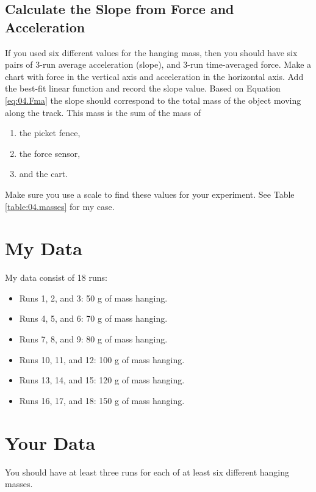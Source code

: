 \subsection{Calculate the Slope from Force and Acceleration}
%
If you used six different values for the hanging mass, then you should have six pairs of 3-run average acceleration (slope), and 3-run time-averaged force. Make a chart with force in the vertical axis and acceleration in the horizontal axis. Add the best-fit linear function and record the slope value. Based on Equation \ref{eq:04.Fma} the slope should correspond to the total mass of the object moving along the track. This mass is the sum of the mass of
\begin{enumerate}
    \item the picket fence,
    \item the force sensor,
    \item and the cart.
\end{enumerate}
Make sure you use a scale to find these values for your experiment. See Table \ref{table:04.masses} for my case.
%
\section{My Data}
%
My data consist of 18 runs:
\begin{itemize}
    \item Runs 1, 2, and 3: 50 g of mass hanging.
    \item Runs 4, 5, and 6: 70 g of mass hanging.
    \item Runs 7, 8, and 9: 80 g of mass hanging.
    \item Runs 10, 11, and 12: 100 g of mass hanging.
    \item Runs 13, 14, and 15: 120 g of mass hanging.
    \item Runs 16, 17, and 18: 150 g of mass hanging.
\end{itemize}
%
\section{Your Data}
%
You should have at least three runs for each of at least six different hanging masses.
%
\newpage
